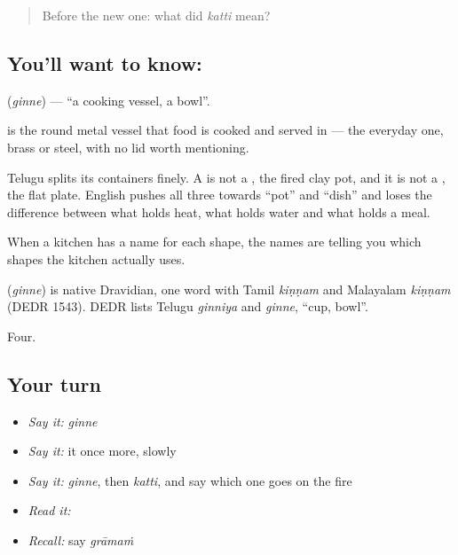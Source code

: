 \begin{quote}
Before the new one: what did \emph{katti} mean?
\end{quote}

\subsection*{You'll want to know: }
\textbf{} (\emph{ginne}) — \textquotedblleft{}a cooking vessel, a bowl\textquotedblright{}.

 is the round metal vessel that food is cooked and served in — the everyday one, brass or steel, with no lid worth mentioning.

Telugu splits its containers finely. A  is not a , the fired clay pot, and it is not a , the flat plate. English pushes all three towards \textquotedblleft{}pot\textquotedblright{} and \textquotedblleft{}dish\textquotedblright{} and loses the difference between what holds heat, what holds water and what holds a meal.

When a kitchen has a name for each shape, the names are telling you which shapes the kitchen actually uses.

\begin{cousinweb}
\textbf{} (\emph{ginne}) is native Dravidian, one word with Tamil \emph{kiṇṇam} and Malayalam \emph{kiṇṇam} (DEDR 1543). DEDR lists Telugu \emph{ginniya} and \emph{ginne}, \textquotedblleft{}cup, bowl\textquotedblright{}.
\end{cousinweb}

\begin{grammarlens}[title={What you've built}]
Four.
\end{grammarlens}

\subsection*{Your turn}
\begin{itemize}
\raggedright
  \item \emph{Say it:} \emph{ginne}
  \item \emph{Say it:} it once more, slowly
  \item \emph{Say it:} \emph{ginne}, then \emph{katti}, and say which one goes on the fire
  \item \emph{Read it:} \textbf{}
  \item \emph{Recall:} say \emph{grāmaṁ}
\end{itemize}

